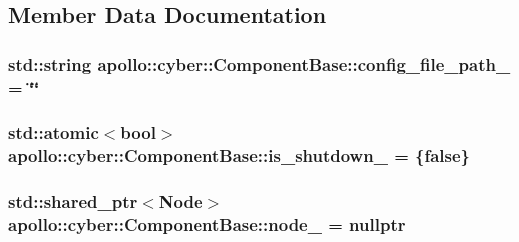 \subsection{Member Data Documentation}
\hypertarget{classapollo_1_1cyber_1_1ComponentBase_afb307772b21999bdb29e2ec866acfc75}{
\subsubsection[{config\-\_\-file\-\_\-path\-\_\-}]{\setlength{\rightskip}{0pt plus 5cm}std\-::string apollo\-::cyber\-::\-Component\-Base\-::config\-\_\-file\-\_\-path\-\_\- = \char`\"{}\char`\"{}\hspace{0.3cm}{\ttfamily [protected]}}}\label{classapollo_1_1cyber_1_1ComponentBase_afb307772b21999bdb29e2ec866acfc75}
\hypertarget{classapollo_1_1cyber_1_1ComponentBase_a8e11428c0f4b5566ac3a602cef96516c}{
\subsubsection[{is\-\_\-shutdown\-\_\-}]{\setlength{\rightskip}{0pt plus 5cm}std\-::atomic$<$bool$>$ apollo\-::cyber\-::\-Component\-Base\-::is\-\_\-shutdown\-\_\- = \{false\}\hspace{0.3cm}{\ttfamily [protected]}}}\label{classapollo_1_1cyber_1_1ComponentBase_a8e11428c0f4b5566ac3a602cef96516c}
\hypertarget{classapollo_1_1cyber_1_1ComponentBase_ae561da7f75d403c45eca1ff3d0cfe2c8}{
\subsubsection[{node\-\_\-}]{\setlength{\rightskip}{0pt plus 5cm}std\-::shared\-\_\-ptr$<${\bf Node}$>$ apollo\-::cyber\-::\-Component\-Base\-::node\-\_\- = nullptr\hspace{0.3cm}{\ttfamily [protected]}}}\label{classapollo_1_1cyber_1_1ComponentBase_ae561da7f75d403c45eca1ff3d0cfe2c8}
